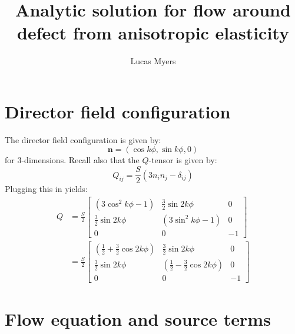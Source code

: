 \documentclass[reqno]{article}
\begin{document}
\title{Analytic solution for flow around defect from anisotropic elasticity}
\author{Lucas Myers}
\maketitle

\section{Director field configuration}
The director field configuration is given by:
\begin{equation}
  \mathbf{n} = \left( \cos k\phi, \sin k\phi, 0 \right)
\end{equation}
for 3-dimensions.
Recall also that the $Q$-tensor is given by:
\begin{equation}
  Q_{ij} = \frac{S}{2} \left( 3 n_i n_j - \delta_{ij} \right)
\end{equation}
Plugging this in yields:
\begin{equation}
  \begin{split}
    Q &= \frac{S}{2} \begin{bmatrix}
      \left(3 \cos^{2}k\phi - 1\right)
      & \tfrac32 \sin 2k \phi
      & 0 \\
      \tfrac32 \sin 2k \phi
      & \left(3 \sin^{2}k\phi - 1\right)
      & 0 \\
      0
      & 0
      & -1
    \end{bmatrix} \\
    &= \frac{S}{2} \begin{bmatrix}
      \left(\tfrac12 + \tfrac32 \cos 2k\phi\right)
      & \tfrac32 \sin 2k \phi
      & 0 \\
      \tfrac32 \sin 2k \phi
      & \left(\tfrac12 - \tfrac32 \cos 2k\phi \right)
      & 0 \\
      0
      & 0
      & -1
    \end{bmatrix}
  \end{split}
\end{equation}

\section{Flow equation and source terms}
\end{document}
